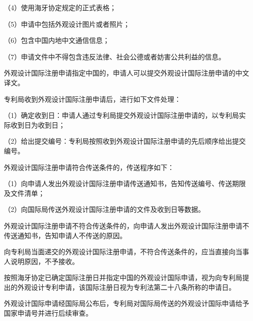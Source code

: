 {\setlength{\parindent}{17.1bp}（4）使用海牙协定规定的正式表格；\par}

{\setlength{\parindent}{17.1bp}（5）申请中包括外观设计图片或者照片；\par}

{\setlength{\parindent}{17.1bp}（6）包含中国内地中文通信信息；\par}

{\setlength{\parindent}{17.1bp}（7）申请文件中不得包含违反法律、社会公德或者妨害公共利益的信息。\par}

外观设计国际注册申请指定中国的，申请人可以提交外观设计国际注册申请的中文译文。

专利局收到外观设计国际注册申请后，进行如下文件处理：

{\setlength{\parindent}{17.1bp}（1）确定收到日：申请人通过专利局提交外观设计国际注册申请的，以专利局实际收到日为收到日；\par}

{\setlength{\parindent}{17.1bp}（2）给出提交编号：专利局按照收到外观设计国际注册申请的先后顺序给出提交编号。\par}

外观设计国际注册申请符合传送条件的，传送程序如下：

{\setlength{\parindent}{17.1bp}（1）向申请人发出外观设计国际注册申请传送通知书，告知传送编号、传送期限及文件清单；\par}

{\setlength{\parindent}{17.1bp}（2）向国际局传送外观设计国际注册申请的文件及收到日等数据。\par}

外观设计国际注册申请不符合传送条件的，向申请人发出外观设计国际注册申请不传送通知书，告知申请人不传送的原因。

向专利局当面递交的外观设计国际注册申请，不符合传送条件的，应当直接向当事人说明原因，不予接收。

按照海牙协定已确定国际注册日并指定中国的外观设计国际申请，视为向专利局提出的外观设计专利申请，该国际注册日视为专利法第二十八条所称的申请日。

外观设计国际申请经国际局公布后，专利局对国际局传送的外观设计国际申请给予国家申请号并进行后续审查。

